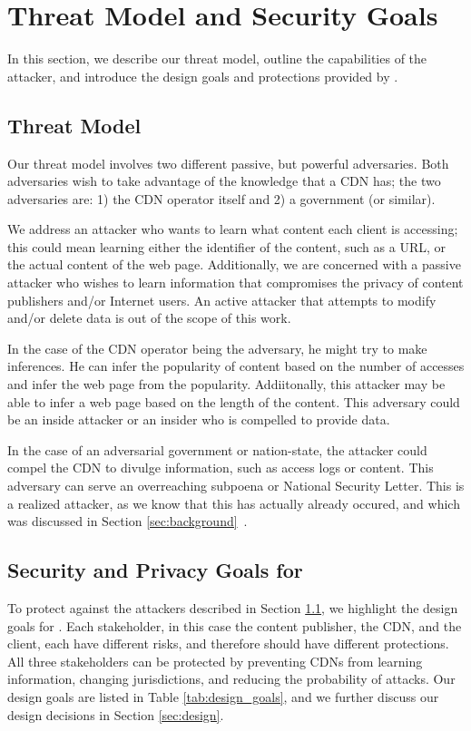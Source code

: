 \section{Threat Model and Security Goals}
\label{sec:threat}
In this section, we describe our threat model, outline the capabilities of the 
attacker, and introduce the design goals and protections provided by \system{}.

\subsection{Threat Model}
\label{sec:attacker}
Our threat model involves two different passive, but powerful adversaries.  Both adversaries 
wish to take advantage of the knowledge that a CDN has; the two adversaries are: 1) the CDN operator 
itself and 2) a government (or similar).  

We address an attacker who wants to learn what content each client is accessing; this 
could mean learning either the identifier of the content, such as a URL, or the actual 
content of the web page.  Additionally, we are concerned with a passive attacker who 
wishes to learn information that compromises the privacy of content publishers and/or Internet 
users.  An active attacker that attempts to modify and/or delete data is out of the 
scope of this work.

In the case of the CDN operator being the adversary, he might try to make inferences. He 
can infer the popularity of content based on the number of accesses and infer the web page 
from the popularity. Addiitonally, this attacker may be able to infer a web page based on the length of the 
content.  This adversary could be an inside attacker or an insider who is 
compelled to provide data. 

In the case of an adversarial government or nation-state, the attacker could compel 
the CDN to divulge information, such as access logs or content.  This adversary can 
serve an overreaching subpoena or National Security Letter.  This is a realized 
attacker, as we know that this has actually already occured, and which was discussed 
in Section \ref{sec:background}~\cite{cloudflare_nsl}.

\subsection{Security and Privacy Goals for \system{}}
\label{sec:goals}
To protect against the attackers described in Section 
\ref{sec:attacker}, we highlight the design goals for \system{}. 
Each stakeholder, in this case the content publisher, the CDN, and the client, each have 
different risks, and therefore should have different protections.  All three stakeholders 
can be protected by preventing CDNs from learning information, changing jurisdictions, and 
reducing the probability of attacks.  Our design goals are listed in Table \ref{tab:design_goals}, 
and we further discuss our design decisions in Section \ref{sec:design}.

